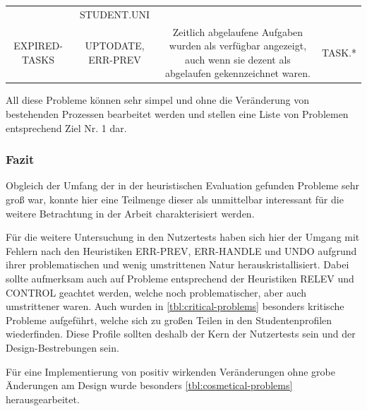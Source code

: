 \documentclass[
  12pt,
  ngerman,
  a4paper,
]{article}
\begin{document}
\begin{longtable}[]{@{}cccc@{}}
\begin{minipage}[t]{0.33\columnwidth}
\end{minipage} & \begin{minipage}[t]{0.32\columnwidth}\centering
STUDENT.UNI\strut
\end{minipage}\tabularnewline
\begin{minipage}[t]{0.11\columnwidth}\centering
EXPIRED-TASKS\strut
\end{minipage} & \begin{minipage}[t]{0.13\columnwidth}\centering
UPTODATE, ERR-PREV\strut
\end{minipage} & \begin{minipage}[t]{0.33\columnwidth}\centering
Zeitlich abgelaufene Aufgaben wurden als verfügbar angezeigt, auch wenn
sie dezent als abgelaufen gekennzeichnet waren.\strut
\end{minipage} & \begin{minipage}[t]{0.32\columnwidth}\centering
TASK.*\strut
\end{minipage}\tabularnewline
\bottomrule
\end{longtable}

All diese Probleme können sehr simpel und ohne die Veränderung von
bestehenden Prozessen bearbeitet werden und stellen eine Liste von
Problemen entsprechend Ziel Nr. 1 dar.

\hypertarget{fazit}{%
\subsubsection{Fazit}\label{fazit}}

Obgleich der Umfang der in der heuristischen Evaluation gefunden
Probleme sehr groß war, konnte hier eine Teilmenge dieser als
unmittelbar interessant für die weitere Betrachtung in der Arbeit
charakterisiert werden.

Für die weitere Untersuchung in den Nutzertests haben sich hier der
Umgang mit Fehlern nach den Heuristiken ERR-PREV, ERR-HANDLE und UNDO
aufgrund ihrer problematischen und wenig umstrittenen Natur
herauskristallisiert. Dabei sollte aufmerksam auch auf Probleme
entsprechend der Heuristiken RELEV und CONTROL geachtet werden, welche
noch problematischer, aber auch umstrittener waren. Auch wurden in
\cref{tbl:critical-problems} besonders kritische Probleme aufgeführt,
welche sich zu großen Teilen in den Studentenprofilen wiederfinden.
Diese Profile sollten deshalb der Kern der Nutzertests sein und der
Design-Bestrebungen sein.

Für eine Implementierung von positiv wirkenden Veränderungen ohne grobe
Änderungen am Design wurde besonders \cref{tbl:cosmetical-problems}
herausgearbeitet.
\end{document}
